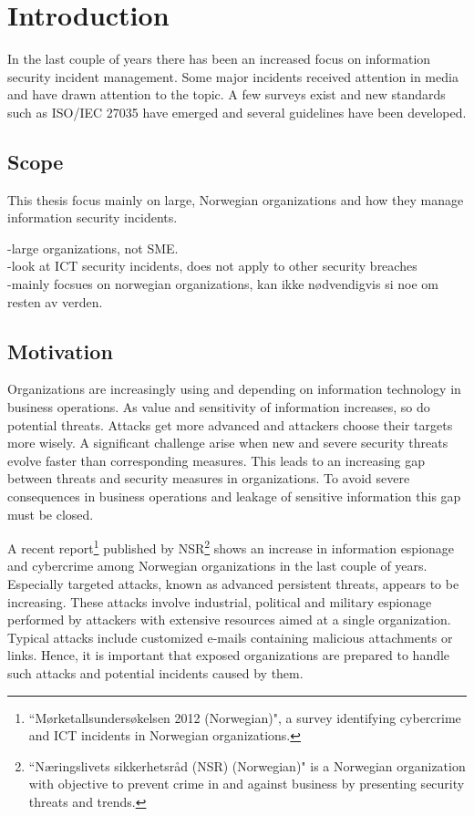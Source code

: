 \chapter{Introduction}
In the last couple of years there has been an increased focus on information security incident management. Some major incidents received attention in media and have drawn attention to the topic. A few surveys exist and new standards such as ISO/IEC 27035 have emerged and several guidelines have been developed.

\section{Scope}
This thesis focus mainly on large, Norwegian organizations and how they manage information security incidents.

-large organizations, not SME.\\
-look at ICT security incidents, does not apply to other security breaches\\
-mainly focsues on norwegian organizations, kan ikke nødvendigvis si noe om resten av verden.

\section{Motivation}
Organizations are increasingly using and depending on information technology in business operations. As value and sensitivity of information increases, so do potential threats. Attacks get more advanced and attackers choose their targets more wisely. A significant challenge arise when new and severe security threats evolve faster than corresponding measures. This leads to an increasing gap between threats and security measures in organizations. To avoid severe consequences in business operations and leakage of sensitive information this gap must be closed.

A recent report\footnote{``Mørketallsundersøkelsen 2012 (Norwegian)", a survey identifying cybercrime and ICT incidents in Norwegian organizations.} published by NSR\footnote{``Næringslivets sikkerhetsråd (NSR) (Norwegian)" is a Norwegian organization with objective to prevent crime in and against business by presenting security threats and trends.} shows an increase in information espionage and cybercrime among Norwegian organizations in the last couple of years\cite{Morketall2012}. Especially targeted attacks, known as advanced persistent threats, appears to be increasing. These attacks involve industrial, political and military espionage performed by attackers with extensive resources aimed at a single organization. Typical attacks include customized e-mails containing malicious attachments or links. Hence, it is important that exposed organizations are prepared to handle such attacks and potential incidents caused by them. 

